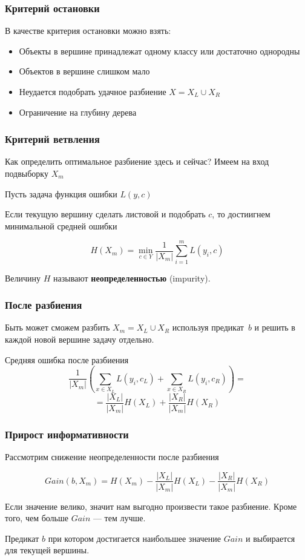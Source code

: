 \documentclass{beamer}
\begin{document}
	\begin{frame}
		\frametitle{Критерий остановки}

		В качестве критерия остановки можно взять:

		\begin{itemize}
			\item Объекты в вершине принадлежат одному классу или достаточно однородны
			\item Объектов в вершине слишком мало
			\item Неудается подобрать удачное разбиение $X = X_L \cup X_R$
			\item Ограничение на глубину дерева
		\end{itemize}
	\end{frame}

	\begin{frame}
		\frametitle{Критерий ветвления}

		Как определить оптимальное разбиение здесь и сейчас? Имеем на вход подвыборку $X_m$

		Пусть задача функция ошибки $L(y, c)$ 

		\vspace{15pt}
		
		Если текущую вершину сделать листовой и подобрать $c$, то достиигнем минимальной средней ошибки

		\[
		H(X_m) = \min_{c \in Y} \frac{1}{|X_m|} \sum_{i=1}^{m} L(y_i, c)
		\]

		Величину $H$ называют \textbf{неопределенностью} (impurity).
	\end{frame}

	\begin{frame}
		\frametitle{После разбиения}

		Быть может сможем разбить $X_m = X_L \cup X_R$  используя предикат~$b$ и решить в каждой новой вершине задачу отдельно.

		\vspace{15pt}

		Средняя ошибка после разбиения
		\[
		\frac{1}{|X_m|} \left( \sum_{x \in X_L} L(y_i, c_L) + \sum_{x \in X_R} L(y_i, c_R) \right)
		=
		\]
		\[
		= \frac{|X_L|}{|X_m|} H(X_L) + \frac{|X_R|}{|X_m|} H(X_R)
		\]
	\end{frame}

	\begin{frame}
		\frametitle{Прирост информативности}

		Рассмотрим снижение неопределенности после разбиения 

		\[
		Gain(b, X_m) = H(X_m) - \frac{|X_L|}{|X_m|} H(X_L) - \frac{|X_R|}{|X_m|} H(X_R)
		\]

		Если значение велико, значит нам выгодно произвести такое разбиение. Кроме того,
		чем больше $Gain$ --- тем лучше. 

		\vspace{15pt}

		Предикат $b$ при котором достигается наибольшее значение $Gain$ и выбирается для текущей вершины.
	\end{frame}
\end{document}
